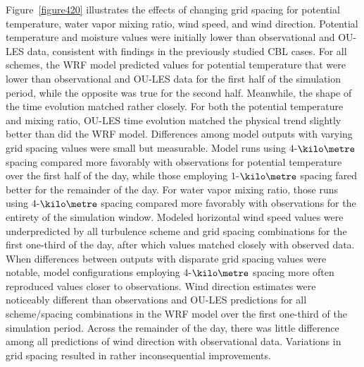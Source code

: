 Figure~\ref{figure420} illustrates the effects of changing grid spacing for potential temperature, water vapor mixing ratio, wind speed, and wind direction. Potential temperature and moisture values were initially lower than observational and OU-LES data, consistent with findings in the previously studied CBL cases. For all schemes, the WRF model predicted values for potential temperature that were lower than observational and OU-LES data for the first half of the simulation period, while the opposite was true for the second half. Meanwhile, the shape of the time evolution matched rather closely. For both the potential temperature and mixing ratio, OU-LES time evolution matched the physical trend slightly better than did the WRF model. Differences among model outputs with varying grid spacing values were small but measurable. Model runs using $4$-$\kilo\metre$ spacing compared more favorably with observations for potential temperature over the first half of the day, while those employing $1$-$\kilo\metre$ spacing fared better for the remainder of the day. For water vapor mixing ratio, those runs using $4$-$\kilo\metre$ spacing compared more favorably with observations for the entirety of the simulation window. Modeled horizontal wind speed values were underpredicted by all turbulence scheme and grid spacing combinations for the first one-third of the day, after which values matched closely with observed data. When differences between outputs with disparate grid spacing values were notable, model configurations employing $4$-$\kilo\metre$ spacing more often reproduced values closer to observations. Wind direction estimates were noticeably different than observations and OU-LES predictions for all scheme\slash spacing combinations in the WRF model over the first one-third of the simulation period. Across the remainder of the day, there was little difference among all predictions of wind direction with observational data. Variations in grid spacing resulted in rather inconsequential improvements.


